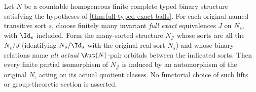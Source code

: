 \begin{theorem}
\label{thm:typed-joint-exact-lifting}
Let $N$ be a countable homogeneous finite complete typed binary
structure satisfying the hypotheses of
\cref{thm:full-typed-exact-balls}.  For each original named
transitive sort $s$, choose finitely many invariant \emph{full exact}
equivalences $J$ on $N_s$, with $\Id_s$ included.
Form the many-sorted structure $N_{\mathcal J}$ whose sorts are
all the $N_s/J$ (identifying $N_s/\Id_s$ with the original real
sort $N_s$) and whose binary relations name \emph{all actual}
$\Aut(N)$-pair orbitals between the indicated sorts.
Then every finite partial isomorphism of $N_{\mathcal J}$ is
induced by an automorphism of the original $N$, acting on its
actual quotient classes.  No functorial choice of such lifts or
group-theoretic section is asserted.
\end{theorem}
